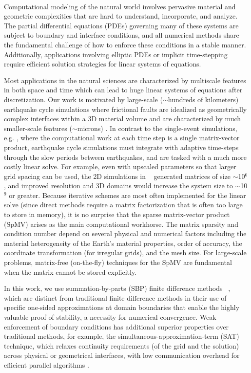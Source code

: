 ~\\
Computational modeling of the natural world involves pervasive material and
geometric complexities that are hard to understand, incorporate, and analyze.
%
The partial differential equations (PDEs) governing many of these systems are
subject to boundary and interface conditions, and all numerical methods share
the fundamental challenge of how to enforce these conditions in a stable manner.
Additionally, applications involving elliptic PDEs or implicit time-stepping require efficient solution strategies for linear systems of equations. 


Most applications in the natural sciences are characterized by multiscale features in both space and time which can lead to huge linear systems of equations after discretization. Our work is motivated by large-scale ($\sim$hundreds of kilometers) earthquake cycle simulations where frictional faults are idealized as geometrically complex interfaces within a 3D material volume and are characterized by much smaller-scale features ($\sim$microns) \cite{Erickson2014, Kozdon2012InteractionOW}. In contrast to the single-event simulations, e.g. \cite{Roten}, where the computational work at each time step is a single matrix-vector product, earthquake cycle simulations must integrate with adaptive time-steps through the slow periods between earthquakes, and are tasked with a much more costly linear solve.  For example, even with upscaled parameters so that larger grid spacing can be
used, the 2D simulations in ~\cite{Erickson2014} generated matrices of size
$\sim$10$^6$, and improved resolution and 3D domains would increase the system
size to $\sim$10$^9$ or greater.
Because iterative schemes are most often implemented for the linear solve (since direct methods require a matrix factorization that is often too large to store in memory), it is no surprise that the sparse matrix-vector product (SpMV) arises as the main computational workhorse. The matrix sparsity and condition number depend on several physical and numerical factors including the material heterogeneity of the Earth’s material properties, order of accuracy, the coordinate transformation (for irregular grids), and the mesh size.  For large-scale problems, matrix-free (on-the-fly) techniques for the SpMV are fundamental when the matrix cannot be stored explicitly.

In this work, we use summation-by-parts (SBP) finite difference
methods ~\cite{KS74, Strand94, MN04, SVARD201417}, which are distinct from traditional finite difference
methods in their use of specific one-sided approximations at domain boundaries that enable the highly valuable proof of stability, a necessity for numerical convergence. Weak enforcement of boundary conditions has additional superior properties over traditional methods, for example, the simultaneous-approximation-term (SAT) technique, which relaxes continuity requirements (of the grid and the solution) across physical or geometrical interfaces, with low communication overhead for efficient parallel algorithms \cite{Fernandez2014}.

